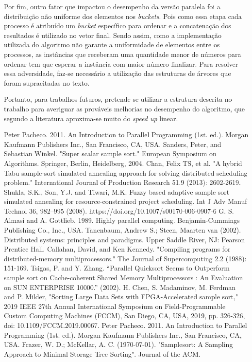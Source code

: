 \documentclass[letterpaper, 10 pt, conference]{ieeeconf}  %
\begin{document}
Por fim, outro fator que impactou o desempenho da versão paralela foi a distribuição não uniforme dos elementos nos \textit{buckets}. Pois como essa etapa cada processo é atribuído um \textit{bucket} específico para ordenar e a concatenação dos resultados é utilizado no vetor final. Sendo assim, como a implementação utilizada do algoritmo não garante a uniformidade de elementos entre os processos, as instâncias que receberam uma quantidade menor de números para ordenar tem que esperar a instância com maior número finalizar. Para resolver essa adversidade, faz-se necessário a utilização das estruturas de árvores que foram supracitadas no texto. 

Portanto, para trabalhos futuros, pretende-se utilizar a estrutura descrita no trabalho \cite{c8} para averiguar as prováveis melhorias no desempenho do algoritmo, que segundo a literatura aproxima-se muito do \textit{speed up} linear.

\begin{thebibliography}{99}

 Peter Pacheco. 2011. An Introduction to Parallel Programming (1st. ed.). Morgan Kaufmann Publishers Inc., San Francisco, CA, USA.
 Sanders, Peter, and Sebastian Winkel. "Super scalar sample sort." European Symposium on Algorithms. Springer, Berlin, Heidelberg, 2004.
 Chan, Felix TS, et al. "A hybrid Tabu sample-sort simulated annealing approach for solving distributed scheduling problem." International Journal of Production Research 51.9 (2013): 2602-2619.
 Shukla, S.K., Son, Y.J. and Tiwari, M.K. Fuzzy based adaptive sample sort simulated annealing for resource-constrained project scheduling. Int J Adv Manuf Technol 36, 982–995 (2008). https://doi.org/10.1007/s00170-006-0907-6
G. S. Almasi and A. Gottlieb. 1989. Highly parallel computing. Benjamin-Cummings Publishing Co., Inc., USA.
Tanenbaum, Andrew S.; Steen, Maarten van (2002). Distributed systems: principles and paradigms. Upper Saddle River, NJ: Pearson Prentice Hall. 
Callahan, David, and Ken Kennedy. "Compiling programs for distributed-memory multiprocessors." The Journal of Supercomputing 2.2 (1988): 151-169.
Tsigas, P. and Y. Zhang. “Parallel Quicksort Seems to Outperform sample sort on Cache-coherent Shared Memory Multiprocessors : An Evaluation on SUN ENTERPRISE 10000.” (2002).
H. Chen, S. Madaminov, M. Ferdman and P. Milder, "Sorting Large Data Sets with FPGA-Accelerated sample sort," 2019 IEEE 27th Annual International Symposium on Field-Programmable Custom Computing Machines (FCCM), San Diego, CA, USA, 2019, pp. 326-326, doi: 10.1109/FCCM.2019.00067.
Peter Pacheco. 2011. An Introduction to Parallel Programming (1st. ed.). Morgan Kaufmann Publishers Inc., San Francisco, CA, USA.
Frazer, W. D.; McKellar, A. C. (1970-07-01). "Samplesort: A Sampling Approach to Minimal Storage Tree Sorting". Journal of the ACM.
\end{thebibliography}
\end{document}
